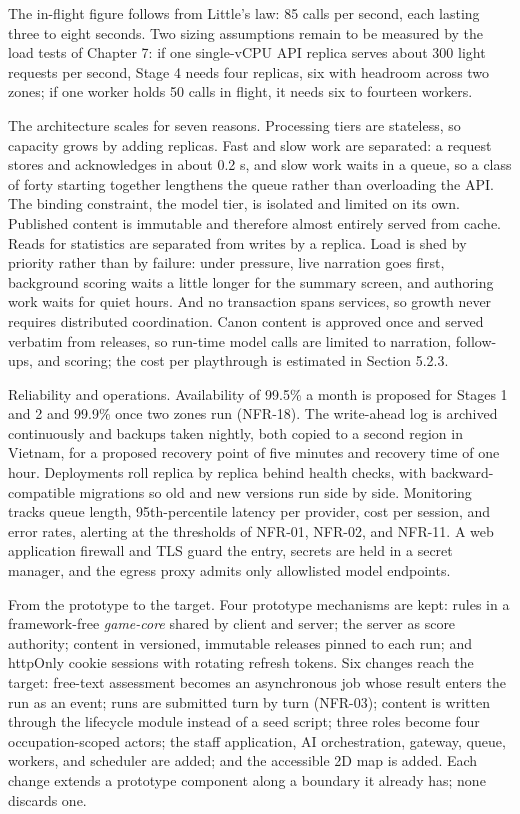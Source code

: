 The in-flight figure follows from Little's law: 85 calls per second, each lasting three to eight seconds. Two sizing assumptions remain to be measured by the load tests of Chapter 7: if one single-vCPU API replica serves about 300 light requests per second, Stage 4 needs four replicas, six with headroom across two zones; if one worker holds 50 calls in flight, it needs six to fourteen workers.

The architecture scales for seven reasons. Processing tiers are stateless, so capacity grows by adding replicas. Fast and slow work are separated: a request stores and acknowledges in about 0.2 s, and slow work waits in a queue, so a class of forty starting together lengthens the queue rather than overloading the API. The binding constraint, the model tier, is isolated and limited on its own. Published content is immutable and therefore almost entirely served from cache. Reads for statistics are separated from writes by a replica. Load is shed by priority rather than by failure: under pressure, live narration goes first, background scoring waits a little longer for the summary screen, and authoring work waits for quiet hours. And no transaction spans services, so growth never requires distributed coordination. Canon content is approved once and served verbatim from releases, so run-time model calls are limited to narration, follow-ups, and scoring; the cost per playthrough is estimated in Section 5.2.3.

Reliability and operations. Availability of 99.5\% a month is proposed for Stages 1 and 2 and 99.9\% once two zones run (NFR-18). The write-ahead log is archived continuously and backups taken nightly, both copied to a second region in Vietnam, for a proposed recovery point of five minutes and recovery time of one hour. Deployments roll replica by replica behind health checks, with backward-compatible migrations so old and new versions run side by side. Monitoring tracks queue length, 95th-percentile latency per provider, cost per session, and error rates, alerting at the thresholds of NFR-01, NFR-02, and NFR-11. A web application firewall and TLS guard the entry, secrets are held in a secret manager, and the egress proxy admits only allowlisted model endpoints.

From the prototype to the target. Four prototype mechanisms are kept: rules in a framework-free \textit{game-core} shared by client and server; the server as score authority; content in versioned, immutable releases pinned to each run; and httpOnly cookie sessions with rotating refresh tokens. Six changes reach the target: free-text assessment becomes an asynchronous job whose result enters the run as an event; runs are submitted turn by turn (NFR-03); content is written through the lifecycle module instead of a seed script; three roles become four occupation-scoped actors; the staff application, AI orchestration, gateway, queue, workers, and scheduler are added; and the accessible 2D map is added. Each change extends a prototype component along a boundary it already has; none discards one.
